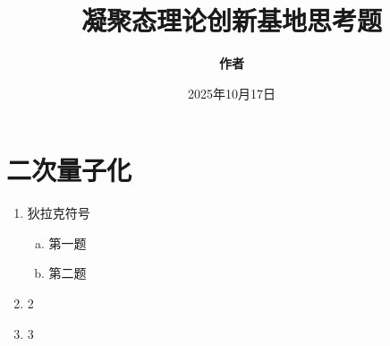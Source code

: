 \documentclass{article}
\title{\textbf{凝聚态理论创新基地思考题}}
\author{\textbf{作者}}
\affil{华中科技大学 \\ name@hust.edu.cn}
\date{2025年10月17日}
\begin{document}
\maketitle

\section*{二次量子化}
\begin{enumerate}
    \item {狄拉克符号
    \begin{enumerate}[(a)]
        \item 第一题
        \item 第二题
    \end{enumerate}
    }
    \item 2
    \item 3
\end{enumerate}
\end{document}
